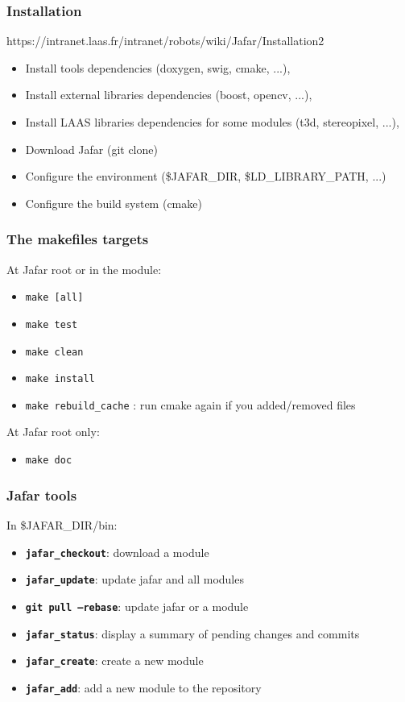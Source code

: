 \documentclass[compress]{beamer}
\begin{document}
\begin{frame}
 \frametitle{Installation}
 https://intranet.laas.fr/intranet/robots/wiki/Jafar/Installation2
 \begin{itemize}
   \item<1-> Install tools dependencies (doxygen, swig, cmake, ...),
   \item<2-> Install external libraries dependencies (boost, opencv, ...),
   \item<3-> Install LAAS libraries dependencies for some modules (t3d, stereopixel, ...),
   \item<4-> Download Jafar (git clone)
   \item<5-> Configure the environment (\$JAFAR\_DIR, \$LD\_LIBRARY\_PATH, ...)
   \item<6-> Configure the build system (cmake)
 \end{itemize}
\end{frame}

\begin{frame}[fragile]
 \frametitle{The makefiles targets}
  At Jafar root or in the module:
  \begin{itemize}
    \item<1-> \verb|make [all]|
    \item<2-> \verb|make test|
    \item<3-> \verb|make clean|
    \item<4-> \verb|make install|
    \item<5-> \verb|make rebuild_cache| : run cmake again if you added/removed files
  \end{itemize}
  At Jafar root only:
  \begin{itemize}
    \item<6-> \verb|make doc|
  \end{itemize}
\end{frame}

\begin{frame}
 \frametitle{Jafar tools}
 In \$JAFAR\_DIR/bin:
 \begin{itemize}
   \item<1-> \textbf{\texttt{jafar\_checkout}}: download a module
   \item<2-> \textbf{\texttt{jafar\_update}}: update jafar and all modules
   \item<3-> \textbf{\texttt{git pull --rebase}}: update jafar or a module
   \item<4-> \textbf{\texttt{jafar\_status}}: display a summary of pending changes and commits
   \item<5-> \textbf{\texttt{jafar\_create}}: create a new module
   \item<6-> \textbf{\texttt{jafar\_add}}: add a new module to the repository
 \end{itemize}
\end{frame}
\end{document}

